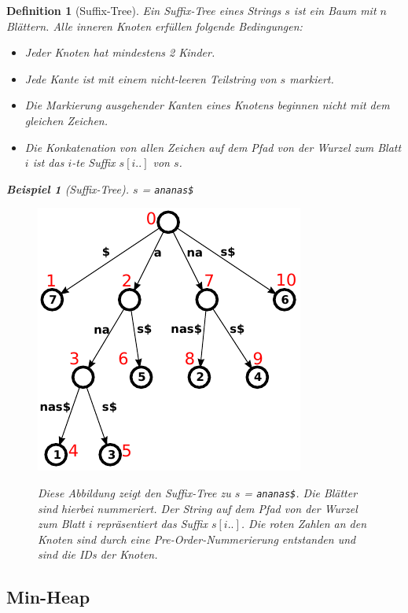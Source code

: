 \documentclass[a4paper,11pt]{scrartcl}%
\theoremstyle{change}
\theoremstyle{nonumberplain}
\theoremstyle{change}
\newtheorem{definition}[theorem]{Definition}
\theoremstyle{nonumberplain}
\theoremstyle{change}
\newtheorem{beispiel}[theorem]{Beispiel}
\theoremstyle{nonumberplain}
\begin{document}
\begin{definition}[Suffix-Tree]
		Ein Suffix-Tree eines Strings $s$ ist ein Baum mit $n$ Blättern. Alle inneren Knoten erfüllen folgende Bedingungen:
		\begin{itemize}
			\item Jeder Knoten hat mindestens 2 Kinder.
			\item Jede Kante ist mit einem nicht-leeren Teilstring von $s$ markiert.
			\item Die Markierung ausgehender Kanten eines Knotens beginnen nicht mit dem gleichen Zeichen.
			\item Die Konkatenation von allen Zeichen auf dem Pfad von der Wurzel zum Blatt $i$ ist das $i$-te Suffix $s[i..]$ von $s$.
		\end{itemize}
		\begin{beispiel}[Suffix-Tree]
			$s$ = \texttt{ananas\$}
			\begin{figure}[h]
				\centering
				  \includegraphics[scale=0.8]{./pics/ananas_suffixTree_inorder}
				  \cite{suffixtreeurl}
				  \caption{Diese Abbildung zeigt den Suffix-Tree zu $s$ = \texttt{ananas\$}. Die Blätter sind hierbei nummeriert. Der String auf dem Pfad von der Wurzel zum Blatt $i$ repräsentiert das Suffix $s[i..]$. Die roten Zahlen an den Knoten sind durch eine Pre-Order-Nummerierung entstanden und sind die IDs der Knoten. }
				  \label{fig:suffixTree}
			\end{figure}
		\end{beispiel}
		
	\end{definition}
	
\subsection{Min-Heap}
\end{document}
